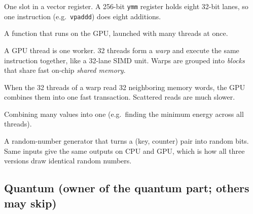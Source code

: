 \begin{description}[leftmargin=0.4cm,style=nextline]
\item[SIMD lane] One slot in a vector register. A 256-bit \texttt{ymm} register holds eight 32-bit lanes, so one instruction (e.g.\ \texttt{vpaddd}) does eight additions.
\item[Kernel] A function that runs on the GPU, launched with many threads at once.
\item[Thread, warp, block] A GPU thread is one worker. 32 threads form a \emph{warp} and execute the same instruction together, like a 32-lane SIMD unit. Warps are grouped into \emph{blocks} that share fast on-chip \emph{shared memory}.
\item[Coalesced access] When the 32 threads of a warp read 32 neighboring memory words, the GPU combines them into one fast transaction. Scattered reads are much slower.
\item[Reduction] Combining many values into one (e.g.\ finding the minimum energy across all threads).
\item[Philox] A random-number generator that turns a (key, counter) pair into random bits. Same inputs give the same outputs on CPU and GPU, which is how all three versions draw identical random numbers.
\end{description}

\subsection{Quantum (owner of the quantum part; others may skip)}

